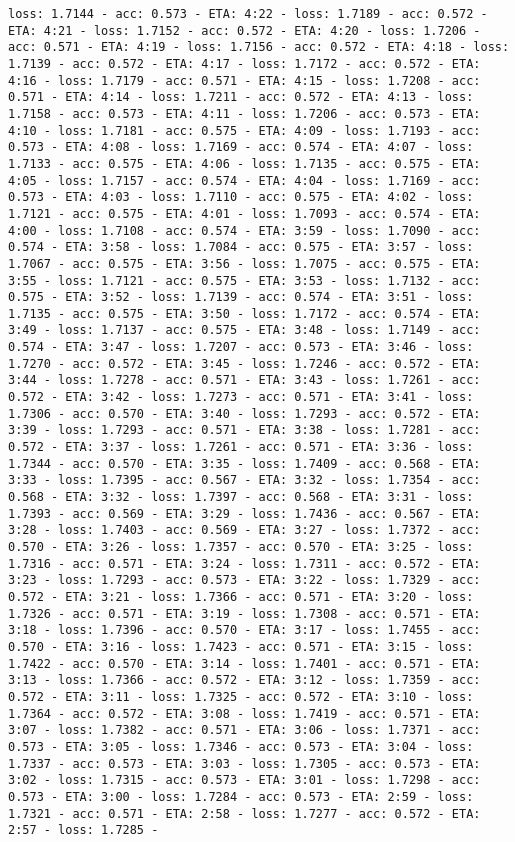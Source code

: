 \documentclass[11pt]{article}
\begin{document}
\begin{Verbatim}[commandchars=\\\{\}]
loss: 1.7144 - acc: 0.573 - ETA: 4:22 - loss: 1.7189 - acc: 0.572 - ETA: 4:21 - loss: 1.7152 - acc: 0.572 - ETA: 4:20 - loss: 1.7206 - acc: 0.571 - ETA: 4:19 - loss: 1.7156 - acc: 0.572 - ETA: 4:18 - loss: 1.7139 - acc: 0.572 - ETA: 4:17 - loss: 1.7172 - acc: 0.572 - ETA: 4:16 - loss: 1.7179 - acc: 0.571 - ETA: 4:15 - loss: 1.7208 - acc: 0.571 - ETA: 4:14 - loss: 1.7211 - acc: 0.572 - ETA: 4:13 - loss: 1.7158 - acc: 0.573 - ETA: 4:11 - loss: 1.7206 - acc: 0.573 - ETA: 4:10 - loss: 1.7181 - acc: 0.575 - ETA: 4:09 - loss: 1.7193 - acc: 0.573 - ETA: 4:08 - loss: 1.7169 - acc: 0.574 - ETA: 4:07 - loss: 1.7133 - acc: 0.575 - ETA: 4:06 - loss: 1.7135 - acc: 0.575 - ETA: 4:05 - loss: 1.7157 - acc: 0.574 - ETA: 4:04 - loss: 1.7169 - acc: 0.573 - ETA: 4:03 - loss: 1.7110 - acc: 0.575 - ETA: 4:02 - loss: 1.7121 - acc: 0.575 - ETA: 4:01 - loss: 1.7093 - acc: 0.574 - ETA: 4:00 - loss: 1.7108 - acc: 0.574 - ETA: 3:59 - loss: 1.7090 - acc: 0.574 - ETA: 3:58 - loss: 1.7084 - acc: 0.575 - ETA: 3:57 - loss: 1.7067 - acc: 0.575 - ETA: 3:56 - loss: 1.7075 - acc: 0.575 - ETA: 3:55 - loss: 1.7121 - acc: 0.575 - ETA: 3:53 - loss: 1.7132 - acc: 0.575 - ETA: 3:52 - loss: 1.7139 - acc: 0.574 - ETA: 3:51 - loss: 1.7135 - acc: 0.575 - ETA: 3:50 - loss: 1.7172 - acc: 0.574 - ETA: 3:49 - loss: 1.7137 - acc: 0.575 - ETA: 3:48 - loss: 1.7149 - acc: 0.574 - ETA: 3:47 - loss: 1.7207 - acc: 0.573 - ETA: 3:46 - loss: 1.7270 - acc: 0.572 - ETA: 3:45 - loss: 1.7246 - acc: 0.572 - ETA: 3:44 - loss: 1.7278 - acc: 0.571 - ETA: 3:43 - loss: 1.7261 - acc: 0.572 - ETA: 3:42 - loss: 1.7273 - acc: 0.571 - ETA: 3:41 - loss: 1.7306 - acc: 0.570 - ETA: 3:40 - loss: 1.7293 - acc: 0.572 - ETA: 3:39 - loss: 1.7293 - acc: 0.571 - ETA: 3:38 - loss: 1.7281 - acc: 0.572 - ETA: 3:37 - loss: 1.7261 - acc: 0.571 - ETA: 3:36 - loss: 1.7344 - acc: 0.570 - ETA: 3:35 - loss: 1.7409 - acc: 0.568 - ETA: 3:33 - loss: 1.7395 - acc: 0.567 - ETA: 3:32 - loss: 1.7354 - acc: 0.568 - ETA: 3:32 - loss: 1.7397 - acc: 0.568 - ETA: 3:31 - loss: 1.7393 - acc: 0.569 - ETA: 3:29 - loss: 1.7436 - acc: 0.567 - ETA: 3:28 - loss: 1.7403 - acc: 0.569 - ETA: 3:27 - loss: 1.7372 - acc: 0.570 - ETA: 3:26 - loss: 1.7357 - acc: 0.570 - ETA: 3:25 - loss: 1.7316 - acc: 0.571 - ETA: 3:24 - loss: 1.7311 - acc: 0.572 - ETA: 3:23 - loss: 1.7293 - acc: 0.573 - ETA: 3:22 - loss: 1.7329 - acc: 0.572 - ETA: 3:21 - loss: 1.7366 - acc: 0.571 - ETA: 3:20 - loss: 1.7326 - acc: 0.571 - ETA: 3:19 - loss: 1.7308 - acc: 0.571 - ETA: 3:18 - loss: 1.7396 - acc: 0.570 - ETA: 3:17 - loss: 1.7455 - acc: 0.570 - ETA: 3:16 - loss: 1.7423 - acc: 0.571 - ETA: 3:15 - loss: 1.7422 - acc: 0.570 - ETA: 3:14 - loss: 1.7401 - acc: 0.571 - ETA: 3:13 - loss: 1.7366 - acc: 0.572 - ETA: 3:12 - loss: 1.7359 - acc: 0.572 - ETA: 3:11 - loss: 1.7325 - acc: 0.572 - ETA: 3:10 - loss: 1.7364 - acc: 0.572 - ETA: 3:08 - loss: 1.7419 - acc: 0.571 - ETA: 3:07 - loss: 1.7382 - acc: 0.571 - ETA: 3:06 - loss: 1.7371 - acc: 0.573 - ETA: 3:05 - loss: 1.7346 - acc: 0.573 - ETA: 3:04 - loss: 1.7337 - acc: 0.573 - ETA: 3:03 - loss: 1.7305 - acc: 0.573 - ETA: 3:02 - loss: 1.7315 - acc: 0.573 - ETA: 3:01 - loss: 1.7298 - acc: 0.573 - ETA: 3:00 - loss: 1.7284 - acc: 0.573 - ETA: 2:59 - loss: 1.7321 - acc: 0.571 - ETA: 2:58 - loss: 1.7277 - acc: 0.572 - ETA: 2:57 - loss: 1.7285 - 
\end{Verbatim}
\end{document}
